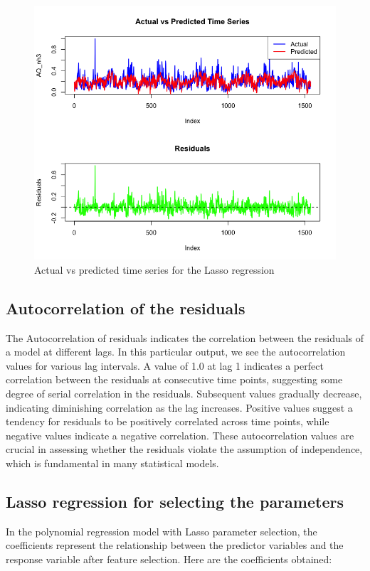 \documentclass[10pt]{article} %
\begin{document}
    \begin{figure}[h]
        \centering
        \includegraphics[scale=0.45]{Assets/Polynomial 2.png}
        \caption{Actual vs predicted time series for the Lasso regression}
        \label{fig:enter-label}
    \end{figure}
    \subsection{Autocorrelation of the residuals}
    The Autocorrelation of residuals indicates the correlation between the residuals of a model at different lags. In this particular output, we see the autocorrelation values for various lag intervals. A value of 1.0 at lag 1 indicates a perfect correlation between the residuals at consecutive time points, suggesting some degree of serial correlation in the residuals. Subsequent values gradually decrease, indicating diminishing correlation as the lag increases. Positive values suggest a tendency for residuals to be positively correlated across time points, while negative values indicate a negative correlation. These autocorrelation values are crucial in assessing whether the residuals violate the assumption of independence, which is fundamental in many statistical models.

    \subsection{Lasso regression for selecting the parameters}
    In the polynomial regression model with Lasso parameter selection, the coefficients represent the relationship between the predictor variables and the response variable after feature selection. Here are the coefficients obtained:
\end{document}
